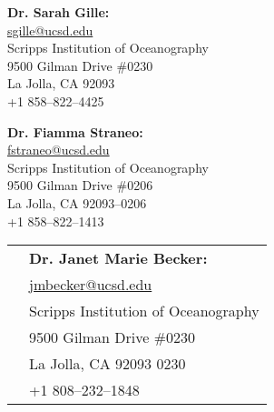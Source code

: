 \documentclass[10pt]{article}
\begin{document}
\begin{minipage}[ht]{0.48\textwidth}
\begin{flushleft}
\textbf{Dr. Sarah Gille:} \\
\vspace{.1cm}
\url{sgille@ucsd.edu}\\
\vspace{.2cm}
\small{Scripps Institution of Oceanography}\\
\small{9500 Gilman Drive \#0230} \\
\small{La Jolla, CA 92093} \\
\small{+1 858--822--4425} 
\end{flushleft}
\end{minipage}
\hfill
\begin{minipage}[ht]{0.48\textwidth}
\begin{flushright}
\textbf{Dr. Fiamma Straneo:} \\
\vspace{.1cm}
\url{fstraneo@ucsd.edu}\\
\vspace{.2cm}
\small{Scripps Institution of Oceanography}\\
\small{9500 Gilman Drive \#0206} \\
\small{La Jolla, CA 92093--0206} \\
\small{+1 858--822--1413} 
\end{flushright}
\end{minipage}
\hfill
\begin{center}
\begin{minipage}[ht]{0.48\textwidth}
\vspace{.1cm}
\begin{center}
\begin{tabular}{l  l }
& \textbf{Dr. Janet Marie Becker:} \\[5pt]
& \url{jmbecker@ucsd.edu} \\[5pt]
&\small{Scripps Institution of Oceanography}\\
&\small{9500 Gilman Drive \#0230} \\
&\small{La Jolla, CA 92093 0230} \\
&\small{+1 808--232--1848} 
\end{tabular}
\end{center}
\end{minipage}
\end{center}
\end{document}
